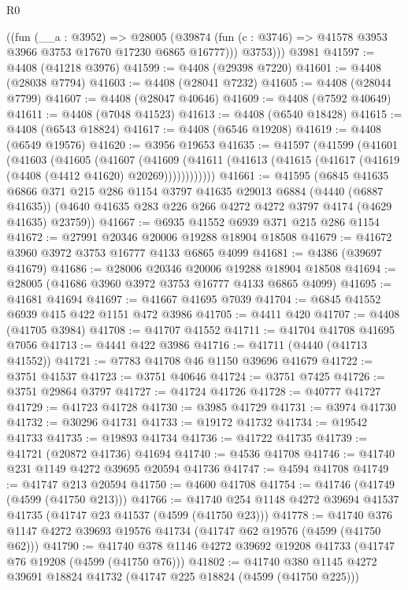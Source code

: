 \begin{lexlean}{R0}
\begin{coremodule}
        ((fun (__a : @3952) =>
        @28005 (@39874 (fun (c : @3746) => @41578 @3953 @3966 @3753 @17670 @17230 @6865 @16777)))
          @3753)))
    @3981
@41597 := @4408 (@41218 @3976)
@41599 := @4408 (@29398 @7220)
@41601 := @4408 (@28038 @7794)
@41603 := @4408 (@28041 @7232)
@41605 := @4408 (@28044 @7799)
@41607 := @4408 (@28047 @40646)
@41609 := @4408 (@7592 @40649)
@41611 := @4408 (@7048 @41523)
@41613 := @4408 (@6540 @18428)
@41615 := @4408 (@6543 @18824)
@41617 := @4408 (@6546 @19208)
@41619 := @4408 (@6549 @19576)
@41620 := @3956 @19653
@41635 := @41597
    (@41599
      (@41601
        (@41603
          (@41605
            (@41607
              (@41609
                (@41611 (@41613 (@41615 (@41617 (@41619 (@4408 (@4412 @41620) @20269))))))))))))
@41661 := @41595
    (@6845
      @41635
      @6866
      @371
      @215
      @286
      @1154
      @3797
      @41635
      @29013
      @6884
      (@4440 (@6887 @41635))
      (@4640 @41635 @283 @226 @266 @4272 @4272 @3797 @4174 (@4629 @41635) @23759))
@41667 := @6935 @41552 @6939 @371 @215 @286 @1154
@41672 := @27991 @20346 @20006 @19288 @18904 @18508
@41679 := @41672 @3960 @3972 @3753 @16777 @4133 @6865 @4099
@41681 := @4386 (@39697 @41679)
@41686 := @28006 @20346 @20006 @19288 @18904 @18508
@41694 := @28005 (@41686 @3960 @3972 @3753 @16777 @4133 @6865 @4099)
@41695 := @41681 @41694
@41697 := @41667 @41695 @7039
@41704 := @6845 @41552 @6939 @415 @422 @1151 @472 @3986
@41705 := @4411 @420
@41707 := @4408 (@41705 @3984)
@41708 := @41707 @41552
@41711 := @41704 @41708 @41695 @7056
@41713 := @4441 @422 @3986
@41716 := @41711 (@4440 (@41713 @41552))
@41721 := @7783 @41708 @46 @1150 @39696 @41679
@41722 := @3751 @41537
@41723 := @3751 @40646
@41724 := @3751 @7425
@41726 := @3751 @29864 @3797
@41727 := @41724 @41726
@41728 := @40777 @41727
@41729 := @41723 @41728
@41730 := @3985 @41729
@41731 := @3974 @41730
@41732 := @30296 @41731
@41733 := @19172 @41732
@41734 := @19542 @41733
@41735 := @19893 @41734
@41736 := @41722 @41735
@41739 := @41721 (@20872 @41736) @41694
@41740 := @4536 @41708
@41746 := @41740 @231 @1149 @4272 @39695 @20594 @41736
@41747 := @4594 @41708
@41749 := @41747 @213 @20594
@41750 := @4600 @41708
@41754 := @41746 (@41749 (@4599 (@41750 @213)))
@41766 := @41740 @254 @1148 @4272 @39694 @41537 @41735 (@41747 @23 @41537 (@4599 (@41750 @23)))
@41778 := @41740 @376 @1147 @4272 @39693 @19576 @41734 (@41747 @62 @19576 (@4599 (@41750 @62)))
@41790 := @41740 @378 @1146 @4272 @39692 @19208 @41733 (@41747 @76 @19208 (@4599 (@41750 @76)))
@41802 := @41740 @380 @1145 @4272 @39691 @18824 @41732 (@41747 @225 @18824 (@4599 (@41750 @225)))

\end{coremodule}
\end{lexlean}
